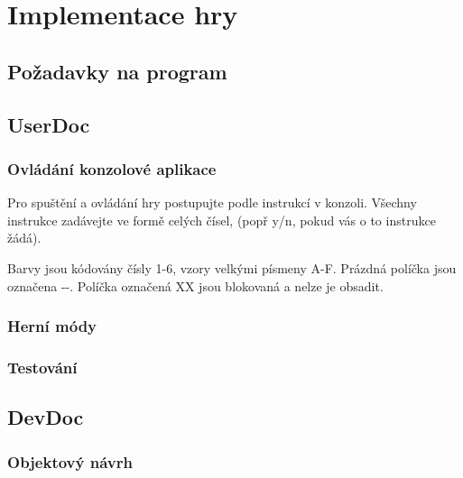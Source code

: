 \chapter{Implementace hry}


\section{Požadavky na program}

\section{UserDoc}

\subsection{Ovládání konzolové aplikace}

Pro spuštění a ovládání hry postupujte podle instrukcí v konzoli.
Všechny instrukce zadávejte ve formě celých čísel, (popř y/n, pokud vás o to instrukce žádá).

Barvy jsou kódovány čísly 1-6, vzory velkými písmeny A-F.
Prázdná políčka jsou označena -{}-.
Políčka označená XX jsou blokovaná a nelze je obsadit.

\subsection{Herní módy}
\subsection{Testování}
\section{DevDoc}
\subsection{Objektový návrh}